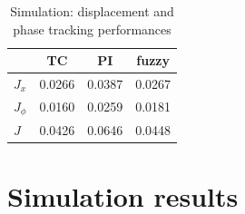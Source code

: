 \documentclass[lettersize,journal]{IEEEtran}
\begin{document}
\begin{table}
    \centering
    \begin{tabular}{|l|c|c|c|} \hline
       \cellcolor{gray}  &  TC  & PI & fuzzy   \\  \hline 
      $J_x$ & 0.0266  & 0.0387  &  0.0267   \\  \hline 
      $J_\phi$  & 0.0160  & 0.0259  & 0.0181    \\ \hline 
       $J$ &  0.0426 & 0.0646  &   0.0448 \\ \hline 
    \end{tabular}
    \vspace{0.1cm}
    \caption{Simulation: displacement and phase tracking performances}
    \label{T_J_simulation}
\end{table}



\section{Simulation results}
\end{document}
